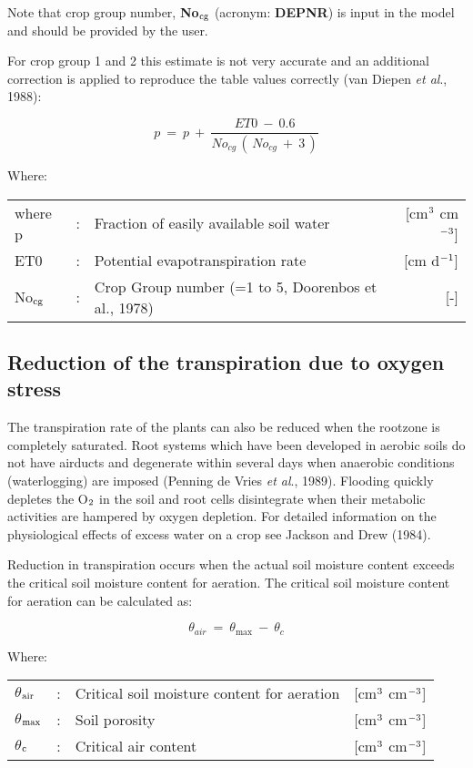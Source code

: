 Note that crop group number, {\bf No$_{{\rm cg}}$} (acronym: {\bf DEPNR}) is input in the model and should
be provided by the user.

For crop group 1 and 2 this estimate is not very accurate and an additional correction is
applied to reproduce the table values correctly (van Diepen {\it et al\/}., 1988):

\begin{equation}
p~=~p~+~{\frac{ET0 ~-~ 0.6}{No _{cg} \, (\, No _{cg} ~+~3\, )}}
\end{equation}

Where:\\
\begin{tabularx}{\textwidth}{llXr}
where p &:& Fraction of easily available soil water  & [cm$^{{\rm 3}}$ cm$^{{\rm -3}}$]\\
ET0 &:& Potential evapotranspiration rate  & [cm d$^{{\rm -1}}$]\\
No$_{{\rm cg}}$ &:& Crop Group number {\small (=1 to 5, Doorenbos et al., 1978)}  & [-]\\
\end{tabularx}

\subsection{Reduction of the transpiration due to oxygen stress}
The transpiration rate of the plants can also be reduced when the rootzone is completely
saturated. Root systems which have been developed in aerobic soils do not have airducts
and degenerate within several days when anaerobic conditions (waterlogging) are imposed
(Penning de Vries {\it et al\/}., 1989). Flooding quickly depletes the O$_{{\rm 2}}$ in the soil and root cells
disintegrate when their metabolic activities are hampered by oxygen depletion. For
detailed information on the physiological effects of excess water on a crop see Jackson
and Drew (1984).

Reduction in transpiration occurs when the actual soil moisture content exceeds the
critical soil moisture content for aeration. The critical soil moisture content for aeration
can be calculated as:

\begin{equation}
\theta_{air} ~=~ \theta_{\max} ~-~\theta_{c} 
\end{equation}

Where:\\
\begin{tabularx}{\textwidth}{llXr}
$\theta$$_{{\rm air}}$ &:& Critical soil moisture content for aeration & [cm$^{{\rm 3}}$ cm$^{{\rm -3}}$]\\
$\theta$$_{{\rm max}}$ &:& Soil porosity & [cm$^{{\rm 3}}$ cm$^{{\rm -3}}$]\\
$\theta$$_{{\rm c}}$ &:& Critical air content & [cm$^{{\rm 3}}$ cm$^{{\rm -3}}$]\\
\end{tabularx}

